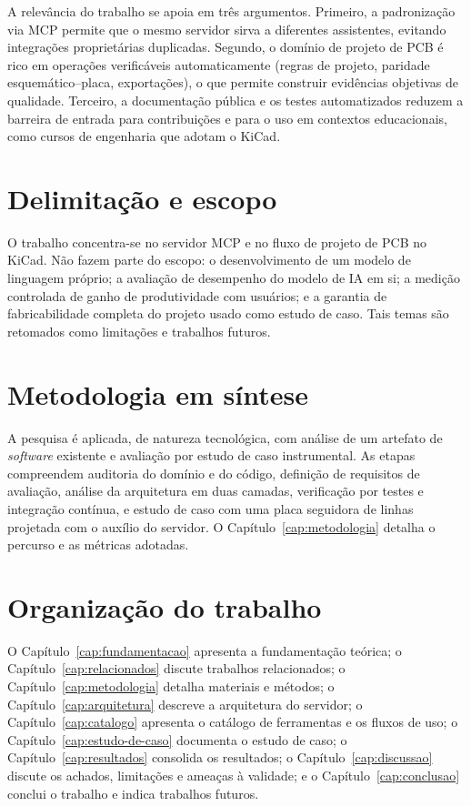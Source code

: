 A relevância do trabalho se apoia em três argumentos. Primeiro, a padronização
via MCP permite que o mesmo servidor sirva a diferentes assistentes, evitando
integrações proprietárias duplicadas. Segundo, o domínio de projeto de PCB é
rico em operações verificáveis automaticamente (regras de projeto, paridade
esquemático--placa, exportações), o que permite construir evidências
objetivas de qualidade. Terceiro, a documentação pública e os testes
automatizados reduzem a barreira de entrada para contribuições e para o uso em
contextos educacionais, como cursos de engenharia que adotam o KiCad.

\section{Delimitação e escopo}

O trabalho concentra-se no servidor MCP e no fluxo de projeto de PCB no KiCad.
Não fazem parte do escopo: o desenvolvimento de um modelo de linguagem próprio;
a avaliação de desempenho do modelo de IA em si; a medição controlada de ganho
de produtividade com usuários; e a garantia de fabricabilidade completa do
projeto usado como estudo de caso. Tais temas são retomados como limitações e
trabalhos futuros.

\section{Metodologia em síntese}

A pesquisa é aplicada, de natureza tecnológica, com análise de um artefato de
\emph{software} existente e avaliação por estudo de caso instrumental. As
etapas compreendem auditoria do domínio e do código, definição de requisitos
de avaliação, análise da arquitetura em duas camadas, verificação por testes e
integração contínua, e estudo de caso com uma placa seguidora de linhas
projetada com o auxílio do servidor. O Capítulo~\ref{cap:metodologia} detalha
o percurso e as métricas adotadas.

\section{Organização do trabalho}

O Capítulo~\ref{cap:fundamentacao} apresenta a fundamentação teórica;
o Capítulo~\ref{cap:relacionados} discute trabalhos relacionados;
o Capítulo~\ref{cap:metodologia} detalha materiais e métodos;
o Capítulo~\ref{cap:arquitetura} descreve a arquitetura do servidor;
o Capítulo~\ref{cap:catalogo} apresenta o catálogo de ferramentas e os fluxos
de uso; o Capítulo~\ref{cap:estudo-de-caso} documenta o estudo de caso;
o Capítulo~\ref{cap:resultados} consolida os resultados;
o Capítulo~\ref{cap:discussao} discute os achados, limitações e ameaças à
validade; e o Capítulo~\ref{cap:conclusao} conclui o trabalho e indica
trabalhos futuros.
